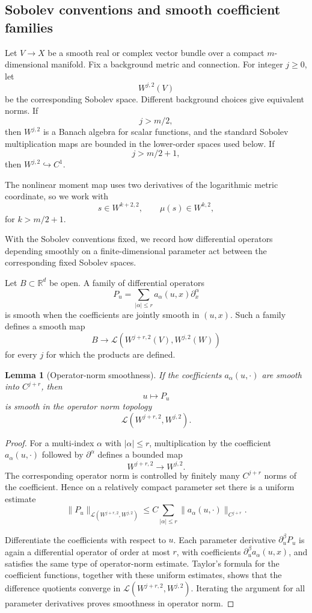 \documentclass[11pt,reqno]{amsart}
\newtheorem{lemma}[theorem]{Lemma}
\theoremstyle{definition}
\theoremstyle{remark}
\newcommand{\R}{\mathbb R}
\newcommand{\abs}[1]{\left\lvert #1\right\rvert}
\begin{document}
\subsection{Sobolev conventions and smooth coefficient families}

Let $V\to X$ be a smooth real or complex vector bundle over a compact $m$-dimensional manifold.  Fix a background metric and connection.  For integer $j\ge0$, let
\[
  W^{j,2}(V)
\]
be the corresponding Sobolev space.  Different background choices give equivalent norms.  If
\[
  j>m/2,
\]
then $W^{j,2}$ is a Banach algebra for scalar functions, and the standard Sobolev multiplication maps are bounded in the lower-order spaces used below.  If
\[
  j>m/2+1,
\]
then $W^{j,2}\hookrightarrow C^1$.

The nonlinear moment map uses two derivatives of the logarithmic metric coordinate, so we work with
\[
  s\in W^{k+2,2},
  \qquad
  \mu(s)\in W^{k,2},
\]
for $k>m/2+1$.


With the Sobolev conventions fixed, we record how differential operators depending smoothly on a finite-dimensional parameter act between the corresponding fixed Sobolev spaces.


Let $B\subset\R^d$ be open.  A family of differential operators
\[
  P_u=\sum_{\abs\alpha\le r}a_\alpha(u,x)\partial_x^\alpha
\]
is smooth when the coefficients are jointly smooth in $(u,x)$.  Such a family defines a smooth map
\[
  B\to\mathcal L(W^{j+r,2}(V),W^{j,2}(W))
\]
for every $j$ for which the products are defined.

\begin{lemma}[Operator-norm smoothness]\label{lem:operator-norm-smoothness}
If the coefficients $a_\alpha(u,\cdot)$ are smooth into $C^{j+r}$, then
\[
  u\mapsto P_u
\]
is smooth in the operator norm topology
\[
  \mathcal L(W^{j+r,2},W^{j,2}).
\]
\end{lemma}

\begin{proof}
For a multi-index $\alpha$ with $|\alpha|\le r$, multiplication by the coefficient $a_\alpha(u,\cdot)$ followed by $\partial^\alpha$ defines a bounded map
\[
  W^{j+r,2}\longrightarrow W^{j,2}.
\]
The corresponding operator norm is controlled by finitely many $C^{j+r}$ norms of the coefficient.  Hence on a relatively compact parameter set there is a uniform estimate
\[
  \|P_u\|_{\mathcal L(W^{j+r,2},W^{j,2})}
  \le C\sum_{|\alpha|\le r}\|a_\alpha(u,\cdot)\|_{C^{j+r}}.
\]

Differentiate the coefficients with respect to $u$.  Each parameter derivative $\partial_u^\beta P_u$ is again a differential operator of order at most $r$, with coefficients $\partial_u^\beta a_\alpha(u,x)$, and satisfies the same type of operator-norm estimate.  Taylor's formula for the coefficient functions, together with these uniform estimates, shows that the difference quotients converge in $\mathcal L(W^{j+r,2},W^{j,2})$.  Iterating the argument for all parameter derivatives proves smoothness in operator norm.
\end{proof}
\end{document}
